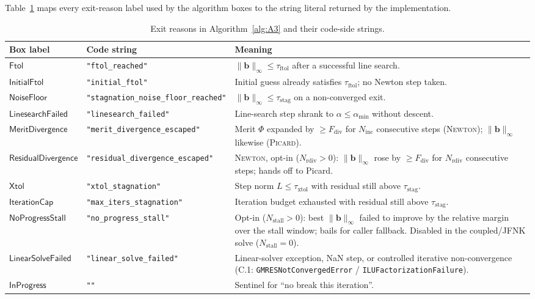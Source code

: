 \documentclass{article}
\newcommand{\code}[1]{\texttt{\small #1}}
\newcommand{\textftol}{\tau_{\mathrm{ftol}}}
\newcommand{\textstag}{\tau_{\mathrm{stag}}}
\newcommand{\textxtol}{\tau_{\mathrm{xtol}}}
\begin{document}
Table~\ref{tab:reasons} maps every exit-reason label used by the
algorithm boxes to the string literal returned by the implementation.

\begin{table}[h]
\centering
\caption{Exit reasons in Algorithm~\ref{alg:A3} and their code-side strings.}
\label{tab:reasons}
\small
\begin{tabularx}{\textwidth}{@{} l l X @{}}
\toprule
\textbf{Box label} & \textbf{Code string} & \textbf{Meaning} \\
\midrule
$\mathsf{Ftol}$               & \code{"ftol\_reached"}                 & $\|\boldsymbol{b}\|_\infty \le \textftol$ after a successful line search. \\
$\mathsf{InitialFtol}$        & \code{"initial\_ftol"}                  & Initial guess already satisfies $\textftol$; no Newton step taken. \\
$\mathsf{NoiseFloor}$         & \code{"stagnation\_noise\_floor\_reached"} & $\|\boldsymbol{b}\|_\infty \le \textstag$ on a non-converged exit. \\
$\mathsf{LinesearchFailed}$   & \code{"linesearch\_failed"}             & Line-search step shrank to $\alpha \le \alpha_{\min}$ without descent. \\
$\mathsf{MeritDivergence}$    & \code{"merit\_divergence\_escaped"}     & Merit $\Phi$ expanded by $\ge F_{\mathrm{div}}$ for $N_{\mathrm{inc}}$ consecutive steps (\textsc{Newton}); $\|\boldsymbol{b}\|_\infty$ likewise (\textsc{Picard}). \\
$\mathsf{ResidualDivergence}$ & \code{"residual\_divergence\_escaped"}   & \textsc{Newton}, opt-in ($N_{\mathrm{rdiv}}>0$): $\|\boldsymbol{b}\|_\infty$ rose by $\ge F_{\mathrm{div}}$ for $N_{\mathrm{rdiv}}$ consecutive steps; hands off to Picard. \\
$\mathsf{Xtol}$               & \code{"xtol\_stagnation"}               & Step norm $L \le \textxtol$ with residual still above $\textstag$. \\
$\mathsf{IterationCap}$       & \code{"max\_iters\_stagnation"}         & Iteration budget exhausted with residual still above $\textstag$. \\
$\mathsf{NoProgressStall}$    & \code{"no\_progress\_stall"}            & Opt-in ($N_{\mathrm{stall}}>0$): best $\|\boldsymbol{b}\|_\infty$ failed to improve by the relative margin over the stall window; bails for caller fallback. Disabled in the coupled/JFNK solve ($N_{\mathrm{stall}}=0$). \\
$\mathsf{LinearSolveFailed}$     & \code{"linear\_solve\_failed"}             & Linear-solver exception, NaN step, or controlled iterative non-convergence (C.1: \code{GMRESNotConvergedError} / \code{ILUFactorizationFailure}). \\
$\mathsf{InProgress}$         & \code{""}                                & Sentinel for ``no break this iteration''. \\
\bottomrule
\end{tabularx}
\end{table}
\end{document}
